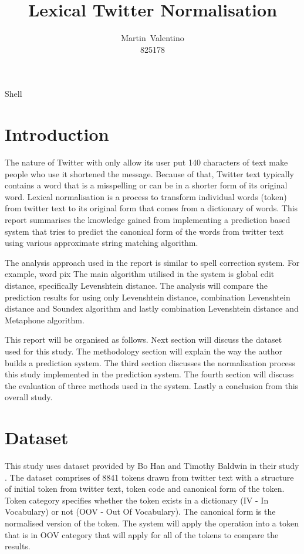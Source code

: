 \documentclass[11pt]{article}
\begin{document}
%
\title{Lexical Twitter Normalisation}
%
%
\author{Martin~Valentino\\825178}
        

%
{Shell}

\maketitle

\section{Introduction}
The nature of Twitter with only allow its user put 140 characters of text make people who use it shortened the message. Because of that, Twitter text typically contains a word that is a misspelling or can be in a shorter form of its original word. Lexical normalisation \cite{LexicalNormalisation} is a process to transform individual words (token) from twitter text to its original form that comes from a dictionary of words. This report summarises the knowledge gained from implementing a prediction based system that tries to predict the canonical form of the words from twitter text using various approximate string matching algorithm.

The analysis approach used in the report is similar to spell correction system. For example, word pix The main algorithm utilised in the system is global edit distance, specifically Levenshtein distance. The analysis will compare the prediction results for using only Levenshtein distance, combination Levenshtein distance and Soundex algorithm and lastly combination Levenshtein distance and Metaphone algorithm.

This report will be organised as follows. Next section will discuss the dataset used for this study. The methodology section will explain the way the author builds a prediction system. The third section discusses the normalisation process this study implemented in the prediction system. The fourth section will discuss the evaluation of three methods used in the system. Lastly a conclusion from this overall study.

\section{Dataset}
This study uses dataset provided by Bo Han and Timothy Baldwin in their study \cite{TwitterDataset}. The dataset comprises of 8841 tokens drawn from twitter text with a structure of initial token from twitter text, token code and canonical form of the token. Token category specifies whether the token exists in a dictionary (IV - In Vocabulary) or not (OOV - Out Of Vocabulary). The canonical form is the normalised version of the token. The system will apply the operation into a token that is in OOV category that will apply for all of the tokens to compare the results.
\end{document}
